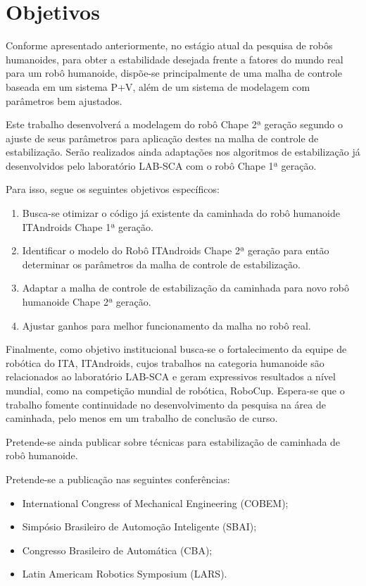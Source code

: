\newpage

\section{Objetivos}

Conforme apresentado anteriormente, no estágio atual da pesquisa de robôs humanoides, para obter a estabilidade desejada frente a fatores do mundo real para um robô humanoide, dispõe-se principalmente de uma malha de controle baseada em um sistema P+V, além de um sistema de modelagem com parâmetros bem ajustados.

Este trabalho desenvolverá a modelagem do robô Chape 2ª geração segundo o ajuste de seus parâmetros para aplicação destes na malha de controle de estabilização. Serão realizados ainda adaptações nos algoritmos de estabilização já desenvolvidos pelo laboratório LAB-SCA com o robô Chape 1ª geração.

Para isso, segue os  seguintes objetivos específicos:

\begin{enumerate}

\item Busca-se otimizar o código já existente da caminhada do robô humanoide ITAndroids Chape 1ª geração.

\item Identificar o modelo do Robô ITAndroids Chape 2ª geração para então determinar os parâmetros da malha de controle de estabilização.

\item Adaptar a malha de controle de estabilização da caminhada para novo robô humanoide Chape 2ª geração.

\item Ajustar ganhos para melhor funcionamento da malha no robô real.
\end{enumerate}

Finalmente, como objetivo institucional busca-se o fortalecimento da equipe de robótica do ITA, ITAndroids, cujos trabalhos na categoria humanoide são relacionados ao laboratório LAB-SCA e geram expressivos resultados a nível mundial, como na competição mundial de robótica, RoboCup. Espera-se que o trabalho fomente continuidade no desenvolvimento da pesquisa na área de caminhada, pelo menos em um trabalho de conclusão de curso.

Pretende-se ainda publicar sobre técnicas para estabilização de caminhada de robô humanoide.

Pretende-se a publicação nas seguintes conferências:
\begin{itemize}

\item International Congress of Mechanical Engineering (COBEM);

\item Simpósio Brasileiro de Automoção Inteligente (SBAI);

\item Congresso Brasileiro de Automática (CBA);

\item Latin Americam Robotics Symposium (LARS).

\end{itemize}

